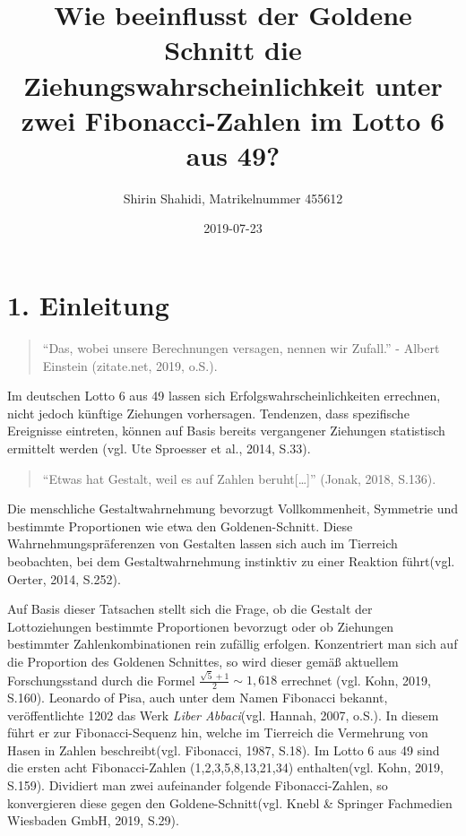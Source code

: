 \documentclass[ngerman,]{article}
\title{Wie beeinflusst der Goldene Schnitt die Ziehungswahrscheinlichkeit unter
zwei Fibonacci-Zahlen im Lotto 6 aus 49?}
\author{Shirin Shahidi, Matrikelnummer 455612}
\date{2019-07-23}
\begin{document}
\maketitle

{
\setcounter{tocdepth}{2}
\tableofcontents
}
\newpage

\section{1. Einleitung}\label{einleitung}

\begin{quote}
``Das, wobei unsere Berechnungen versagen, nennen wir Zufall.'' - Albert
Einstein (zitate.net, 2019, o.S.).
\end{quote}

Im deutschen Lotto 6 aus 49 lassen sich Erfolgswahrscheinlichkeiten
errechnen, nicht jedoch künftige Ziehungen vorhersagen. Tendenzen, dass
spezifische Ereignisse eintreten, können auf Basis bereits vergangener
Ziehungen statistisch ermittelt werden (vgl. Ute Sproesser et al., 2014,
S.33).

\begin{quote}
``Etwas hat Gestalt, weil es auf Zahlen beruht{[}\ldots{}{]}'' (Jonak,
2018, S.136).
\end{quote}

Die menschliche Gestaltwahrnehmung bevorzugt Vollkommenheit, Symmetrie
und bestimmte Proportionen wie etwa den Goldenen-Schnitt. Diese
Wahrnehmungspräferenzen von Gestalten lassen sich auch im Tierreich
beobachten, bei dem Gestaltwahrnehmung instinktiv zu einer Reaktion
führt(vgl. Oerter, 2014, S.252).

Auf Basis dieser Tatsachen stellt sich die Frage, ob die Gestalt der
Lottoziehungen bestimmte Proportionen bevorzugt oder ob Ziehungen
bestimmter Zahlenkombinationen rein zufällig erfolgen. Konzentriert man
sich auf die Proportion des Goldenen Schnittes, so wird dieser gemäß
aktuellem Forschungsstand durch die Formel
\(\frac{\sqrt{5} + 1}{2}\sim1,618\) errechnet (vgl. Kohn, 2019, S.160).
Leonardo of Pisa, auch unter dem Namen Fibonacci bekannt,
veröffentlichte 1202 das Werk \emph{Liber Abbaci}(vgl. Hannah, 2007,
o.S.). In diesem führt er zur Fibonacci-Sequenz hin, welche im Tierreich
die Vermehrung von Hasen in Zahlen beschreibt(vgl. Fibonacci, 1987,
S.18). Im Lotto 6 aus 49 sind die ersten acht Fibonacci-Zahlen
(1,2,3,5,8,13,21,34) enthalten(vgl. Kohn, 2019, S.159). Dividiert man
zwei aufeinander folgende Fibonacci-Zahlen, so konvergieren diese gegen
den Goldene-Schnitt(vgl. Knebl \& Springer Fachmedien Wiesbaden GmbH,
2019, S.29).
\end{document}
